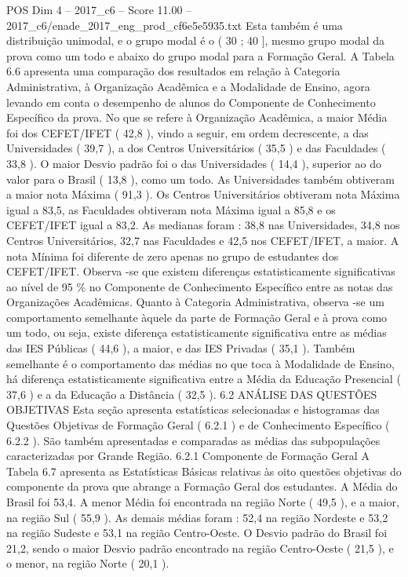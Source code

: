 \begin{textsample}{POS Dim 4 – 2017\_c6 – Score 11.00 – 2017\_c6/enade\_2017\_eng\_prod\_cf6e5e5935.txt}
Esta também é uma distribuição unimodal, e o grupo modal é o ( 30 ; 40 ], mesmo grupo modal da prova como um todo e abaixo do grupo modal para a Formação Geral.
A Tabela 6.6 apresenta uma comparação dos resultados em relação à Categoria Administrativa, à Organização Acadêmica e a Modalidade de Ensino, agora levando em conta o desempenho de alunos do Componente de Conhecimento Específico da prova.
No que se refere à Organização Acadêmica, a maior Média foi dos CEFET/IFET ( 42,8 ), vindo a seguir, em ordem decrescente, a das Universidades ( 39,7 ), a dos Centros Universitários ( 35,5 ) e das Faculdades ( 33,8 ).
O maior Desvio padrão foi o das Universidades ( 14,4 ), superior ao do valor para o Brasil ( 13,8 ), como um todo.
As Universidades também obtiveram a maior nota Máxima ( 91,3 ).
Os Centros Universitários obtiveram nota Máxima igual a 83,5, as Faculdades obtiveram nota Máxima igual a 85,8 e os CEFET/IFET igual a 83,2.
As medianas foram : 38,8 nas Universidades, 34,8 nos Centros Universitários, 32,7 nas Faculdades e 42,5 nos CEFET/IFET, a maior.
A nota Mínima foi diferente de zero apenas no grupo de estudantes dos CEFET/IFET.
Observa -se que existem diferenças estatisticamente significativas ao nível de 95 \% no Componente de Conhecimento Específico entre as notas das Organizações Acadêmicas.
Quanto à Categoria Administrativa, observa -se um comportamento semelhante àquele da parte de Formação Geral e à prova como um todo, ou seja, existe diferença estatisticamente significativa entre as médias das IES Públicas ( 44,6 ), a maior, e das IES Privadas ( 35,1 ).
Também semelhante é o comportamento das médias no que toca à Modalidade de Ensino, há diferença estatisticamente significativa entre a Média da Educação Presencial ( 37,6 ) e a da Educação a Distância ( 32,5 ). 6.2 ANÁLISE DAS QUESTÕES OBJETIVAS Esta seção apresenta estatísticas selecionadas e histogramas das Questões Objetivas de Formação Geral ( 6.2.1 ) e de Conhecimento Específico ( 6.2.2 ).
São também apresentadas e comparadas as médias das subpopulações caracterizadas por Grande Região. 6.2.1 Componente de Formação Geral A Tabela 6.7 apresenta as Estatísticas Básicas relativas às oito questões objetivas do componente da prova que abrange a Formação Geral dos estudantes.
A Média do Brasil foi 53,4.
A menor Média foi encontrada na região Norte ( 49,5 ), e a maior, na região Sul ( 55,9 ).
As demais médias foram : 52,4 na região Nordeste e 53,2 na região Sudeste e 53,1 na região Centro-Oeste.
O Desvio padrão do Brasil foi 21,2, sendo o maior Desvio padrão encontrado na região Centro-Oeste ( 21,5 ), e o menor, na região Norte ( 20,1 ).

\end{textsample}
